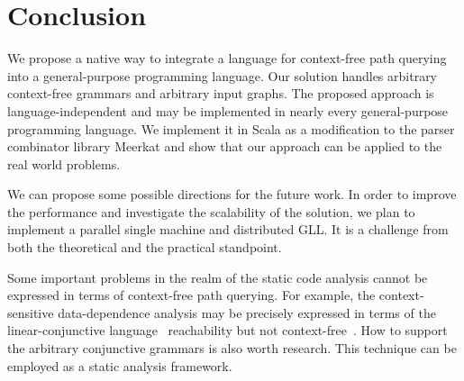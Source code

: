 \section{Conclusion}
\label{sec:conclusion}

We propose a native way to integrate a language for context-free path querying into a general-purpose programming language.
Our solution handles arbitrary context-free grammars and arbitrary input graphs.
The proposed approach is language-independent and may be implemented in nearly every general-purpose programming language.
We implement it in Scala as a modification to the parser combinator library Meerkat and show that our approach can be applied to the real world problems.

We can propose some possible directions for the future work.
In order to improve the performance and investigate the scalability of the solution, we plan to implement a parallel single machine and distributed GLL.
It is a challenge from both the theoretical and the practical standpoint.

Some important problems in the realm of the static code analysis cannot be expressed in terms of context-free path querying.
For example, the context-sensitive data-dependence analysis may be precisely expressed in terms of the linear-conjunctive language~\cite{Okhotin2003LCL} reachability but not context-free~\cite{LCLReachability}.
How to support the arbitrary conjunctive grammars is also worth research.
This technique can be employed as a static analysis framework.